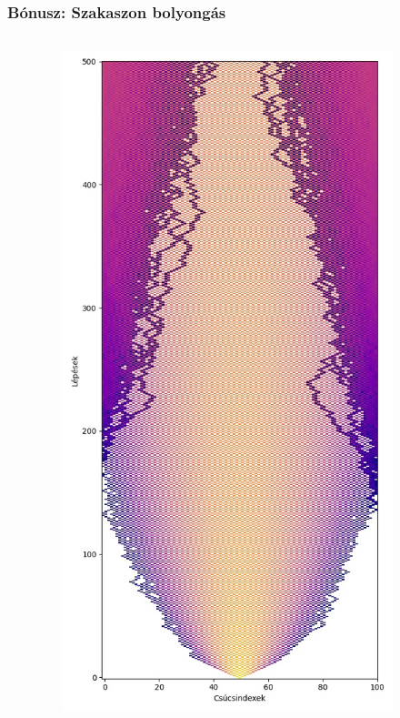 \documentclass[aspectratio=169]{beamer}
\begin{document}
\begin{frame}
  \frametitle{Bónusz: Szakaszon bolyongás}

  \begin{columns}[onlytextwidth]
    \begin{column}{.25\textwidth}
    \end{column}
    \begin{column}{.25\textwidth}
      \begin{figure}
        \includegraphics[width=0.9\textwidth]{./figures/classical_simulation_long.jpg}

\end{figure}
\end{column}
\end{columns}
\end{frame}
\end{document}
